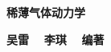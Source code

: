 
\thispagestyle{empty}

\begin{center}

	


	\vspace{1cm}
	\LARGE
	\textbf{稀薄气体动力学}
	
	
	
	\vspace{2.5cm}
	\Large
	\textbf{吴雷 ~ 李琪 ~ 编著 }
	
	
	
\end{center}



